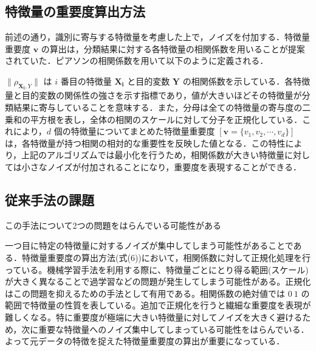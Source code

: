\subsection{特徴量の重要度算出方法}

前述の通り，識別に寄与する特徴量を考慮した上で，ノイズを付加する．特徴量重要度 $\bm{v}$ の算出は，分類結果に対する各特徴量の相関係数を用いることが提案されていた．ピアソンの相関係数を用いて以下のように定義される．

$\|\rho_{\bm{X_i},Y}\|$ は $i$ 番目の特徴量 $\bm{X_i}$ と目的変数 $\bm{Y}$ の相関係数を示している．各特徴量と目的変数の関係性の強さを示す指標であり，値が大きいほどその特徴量が分類結果に寄与していることを意味する．また，分母は全ての特徴量の寄与度の二乗和の平方根を表し，全体の相関のスケールに対して分子を正規化している．これにより，$d$ 個の特徴量についてまとめた特徴量重要度 $[ \bm{v} = \{v_1, v_2, \cdots, v_d\} ]$ は，各特徴量が持つ相関の相対的な重要性を反映した値となる．この特性により，上記のアルゴリズムでは最小化を行うため，相関係数が大きい特徴量に対しては小さなノイズが付加されることになり，重要度を表現することができる．



\subsection{従来手法の課題}

この手法について2つの問題をはらんでいる可能性がある

一つ目に特定の特徴量に対するノイズが集中してしまう可能性があることである．特徴量重要度の算出方法(式(6))において，相関係数に対して正規化処理を行っている。機械学習手法を利用する際に、特徴量ごとにとり得る範囲(スケール)が大きく異なることで過学習などの問題が発生してしまう可能性がある。正規化はこの問題を抑えるための手法として有用である。\cite{LawOfAwesomeDataScientist}相関係数の絶対値では $0~1$ の範囲で特徴量の性質を表している。追加で正規化を行うと繊細な重要度を表現が難しくなる。特に重要度が極端に大きい特徴量に対してノイズを大きく避けるため，次に重要な特徴量へのノイズ集中してしまっている可能性をはらんでいる．よって元データの特徴を捉えた特徴量重要度の算出が重要になっている．
    

